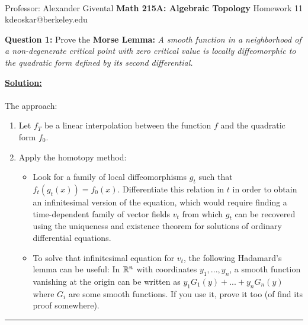 \documentclass[11pt]{article}
\begin{document}
\thispagestyle{empty}
\bigskip \
\vspace{0.1cm}

\begin{center}
{\fontsize{22}{22} \selectfont Professor: Alexander Givental}
\vskip 16pt
{\fontsize{30}{30} \selectfont \bf \sffamily Math 215A: Algebraic Topology}
\vskip 24pt
{\fontsize{14}{14} \selectfont \rmfamily Homework 11} 
\vskip 6pt
{\fontsize{14}{14} \selectfont \ttfamily kdeoskar@berkeley.edu} 
\vskip 24pt
\end{center}





\begin{bluebox}
  \textbf{Question 1:} Prove the \textbf{Morse Lemma:} \textit{A smooth function in a neighborhood of a non-degenerate critical point with zero critical value is locally diffeomorphic to the quadratic form defined by its second differential. }
\end{bluebox}

\vskip 0.5cm
\textbf{\underline{Solution:}}
\\
\\
The approach: 
\begin{enumerate}
  \item Let $f_T$ be a linear interpolation between the function $f$ and the quadratic form $f_0$.
  \item Apply the homotopy method: 
  \begin{itemize}
    \item Look for a family of local diffeomorphisms $g_t$ such that $f_t(g_t(x)) = f_0(x)$. Differentiate this relation in $t$ in order to obtain an infinitesimal version of the equation, which would require finding a time-dependent family of vector fields $v_t$ from which $g_t$ can be recovered using the uniqueness and existence theorem for solutions of ordinary differential equations. 
    \item To solve that infinitesimal equation for $v_t$, the following Hadamard's lemma can be useful: In $\mathbb{R}^n$ with coordinates $y_1,...,y_n$, a smooth function vanishing at the origin can be written as $y_1G_1(y)+...+y_nG_n(y)$ where $G_i$ are some smooth functions. If you use it, prove it too (of find its proof somewhere).
  \end{itemize}
\end{enumerate}
\vskip 0.5cm
\hrule
\pagebreak
\end{document}
